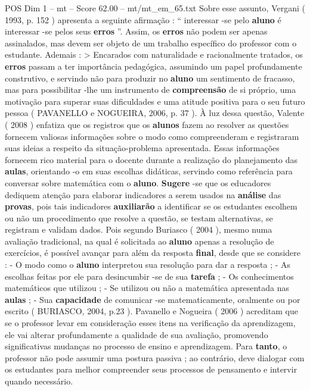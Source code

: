 \begin{textsample}{POS Dim 1 – mt – Score 62.00 – mt/mt\_em\_65.txt}
Sobre esse assunto, Vergani ( 1993, p. 152 ) apresenta a seguinte afirmação : “ interessar -se pelo \textbf{aluno} é interessar -se pelos seus \textbf{erros} ”.
Assim, os \textbf{erros} não podem ser apenas assinalados, mas devem ser objeto de um trabalho específico do professor com o estudante.
Ademais : > Encarados com naturalidade e racionalmente tratados, os \textbf{erros} passam a ter importância pedagógica, assumindo um papel profundamente construtivo, e servindo não para produzir no \textbf{aluno} um sentimento de fracasso, mas para possibilitar -lhe um instrumento de \textbf{compreensão} de si próprio, uma motivação para superar suas dificuldades e uma atitude positiva para o seu futuro pessoa ( PAVANELLO e NOGUEIRA, 2006, p. 37 ).
À luz dessa questão, Valente ( 2008 ) enfatiza que os registros que os \textbf{alunos} fazem ao resolver as questões fornecem valiosas informações sobre o modo como compreenderam e registraram suas ideias a respeito da situação-problema apresentada.
Essas informações fornecem rico material para o docente durante a realização do planejamento das \textbf{aulas}, orientando -o em suas escolhas didáticas, servindo como referência para conversar sobre matemática com o \textbf{aluno}. \textbf{Sugere} -se que os educadores dediquem atenção para elaborar indicadores a serem usados na \textbf{análise} das \textbf{provas}, pois tais indicadores \textbf{auxiliarão} a identificar se os estudantes escolhem ou não um procedimento que resolve a questão, se testam alternativas, se registram e validam dados.
Pois segundo Buriasco ( 2004 ), mesmo numa avaliação tradicional, na qual é solicitada ao \textbf{aluno} apenas a resolução de exercícios, é possível avançar para além da resposta \textbf{final}, desde que se considere : - O modo como o \textbf{aluno} interpretou sua resolução para dar a resposta ; - As escolhas feitas por ele para desincumbir -se de sua \textbf{tarefa} ; - Os conhecimentos matemáticos que utilizou ; - Se utilizou ou não a matemática apresentada nas \textbf{aulas} ; - Sua \textbf{capacidade} de comunicar -se matematicamente, oralmente ou por escrito ( BURIASCO, 2004, p.23 ).
Pavanello e Nogueira ( 2006 ) acreditam que se o professor levar em consideração esses itens na verificação da aprendizagem, ele vai alterar profundamente a qualidade de sua avaliação, promovendo significativas mudanças no processo de ensino e aprendizagem.
Para \textbf{tanto}, o professor não pode assumir uma postura passiva ; ao contrário, deve dialogar com os estudantes para melhor compreender seus processos de pensamento e intervir quando necessário.

\end{textsample}
